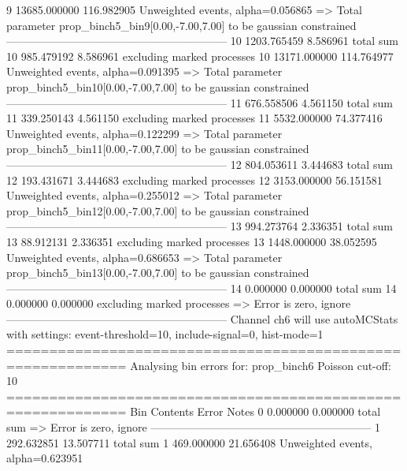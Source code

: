 9          13685.000000    116.982905      Unweighted events, alpha=0.056865
  => Total parameter prop_binch5_bin9[0.00,-7.00,7.00] to be gaussian constrained
------------------------------------------------------------
10         1203.765459     8.586961        total sum                     
10         985.479192      8.586961        excluding marked processes    
10         13171.000000    114.764977      Unweighted events, alpha=0.091395
  => Total parameter prop_binch5_bin10[0.00,-7.00,7.00] to be gaussian constrained
------------------------------------------------------------
11         676.558506      4.561150        total sum                     
11         339.250143      4.561150        excluding marked processes    
11         5532.000000     74.377416       Unweighted events, alpha=0.122299
  => Total parameter prop_binch5_bin11[0.00,-7.00,7.00] to be gaussian constrained
------------------------------------------------------------
12         804.053611      3.444683        total sum                     
12         193.431671      3.444683        excluding marked processes    
12         3153.000000     56.151581       Unweighted events, alpha=0.255012
  => Total parameter prop_binch5_bin12[0.00,-7.00,7.00] to be gaussian constrained
------------------------------------------------------------
13         994.273764      2.336351        total sum                     
13         88.912131       2.336351        excluding marked processes    
13         1448.000000     38.052595       Unweighted events, alpha=0.686653
  => Total parameter prop_binch5_bin13[0.00,-7.00,7.00] to be gaussian constrained
------------------------------------------------------------
14         0.000000        0.000000        total sum                     
14         0.000000        0.000000        excluding marked processes    
  => Error is zero, ignore      
------------------------------------------------------------
Channel ch6 will use autoMCStats with settings: event-threshold=10, include-signal=0, hist-mode=1
============================================================
Analysing bin errors for: prop_binch6
Poisson cut-off: 10
============================================================
Bin        Contents        Error           Notes                         
0          0.000000        0.000000        total sum                     
  => Error is zero, ignore      
------------------------------------------------------------
1          292.632851      13.507711       total sum                     
1          469.000000      21.656408       Unweighted events, alpha=0.623951
